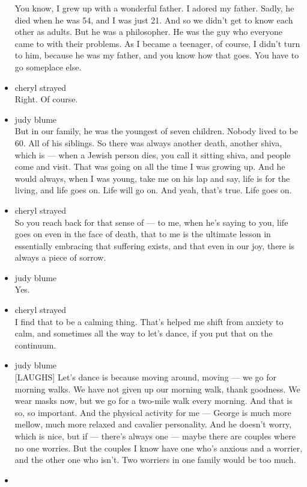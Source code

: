 \begin{itemize}
  You know, I grew up with a wonderful father. I adored my father.
  Sadly, he died when he was 54, and I was just 21. And so we didn't get
  to know each other as adults. But he was a philosopher. He was the guy
  who everyone came to with their problems. As I became a teenager, of
  course, I didn't turn to him, because he was my father, and you know
  how that goes. You have to go someplace else.
\item
  cheryl strayed\\
  Right. Of course.
\item
  judy blume\\
  But in our family, he was the youngest of seven children. Nobody lived
  to be 60. All of his siblings. So there was always another death,
  another shiva, which is --- when a Jewish person dies, you call it
  sitting shiva, and people come and visit. That was going on all the
  time I was growing up. And he would always, when I was young, take me
  on his lap and say, life is for the living, and life goes on. Life
  will go on. And yeah, that's true. Life goes on.
\item
  cheryl strayed\\
  So you reach back for that sense of --- to me, when he's saying to
  you, life goes on even in the face of death, that to me is the
  ultimate lesson in essentially embracing that suffering exists, and
  that even in our joy, there is always a piece of sorrow.
\item
  judy blume\\
  Yes.
\item
  cheryl strayed\\
  I find that to be a calming thing. That's helped me shift from anxiety
  to calm, and sometimes all the way to let's dance, if you put that on
  the continuum.
\item
  judy blume\\
  {[}LAUGHS{]} Let's dance is because moving around, moving --- we go
  for morning walks. We have not given up our morning walk, thank
  goodness. We wear masks now, but we go for a two-mile walk every
  morning. And that is so, so important. And the physical activity for
  me --- George is much more mellow, much more relaxed and cavalier
  personality. And he doesn't worry, which is nice, but if --- there's
  always one --- maybe there are couples where no one worries. But the
  couples I know have one who's anxious and a worrier, and the other one
  who isn't. Two worriers in one family would be too much.
\item

\end{itemize}
